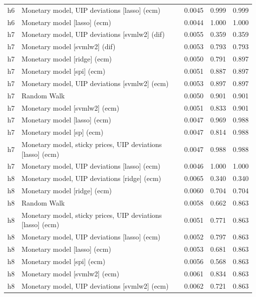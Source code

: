 \begin{ThreePartTable}
\begin{longtable}[t]{cp{5.5cm}ccc}
h6 & \raggedright Monetary model, UIP deviations [lasso] (ecm) & 0.0045 & 0.999 & 0.999\\
h6 & \raggedright Monetary model [lasso] (ecm) & 0.0044 & 1.000 & 1.000\\
\addlinespace
h7 & \raggedright Monetary model, UIP deviations [svmlw2] (dif) & 0.0055 & 0.359 & 0.359\\
h7 & \raggedright Monetary model [svmlw2] (dif) & 0.0053 & 0.793 & 0.793\\
h7 & \raggedright Monetary model [ridge] (ecm) & 0.0050 & 0.791 & 0.897\\
h7 & \raggedright Monetary model [spi] (ecm) & 0.0051 & 0.887 & 0.897\\
h7 & \raggedright Monetary model, UIP deviations [svmlw2] (ecm) & 0.0053 & 0.897 & 0.897\\
h7 & \raggedright Random Walk & 0.0050 & 0.901 & 0.901\\
h7 & \raggedright Monetary model [svmlw2] (ecm) & 0.0051 & 0.833 & 0.901\\
h7 & \raggedright Monetary model [lasso] (ecm) & 0.0047 & 0.969 & 0.988\\
h7 & \raggedright Monetary model [sp] (ecm) & 0.0047 & 0.814 & 0.988\\
h7 & \raggedright Monetary model, sticky prices, UIP deviations [lasso] (ecm) & 0.0047 & 0.988 & 0.988\\
h7 & \raggedright Monetary model, UIP deviations [lasso] (ecm) & 0.0046 & 1.000 & 1.000\\
\addlinespace
h8 & \raggedright Monetary model, UIP deviations [ridge] (ecm) & 0.0065 & 0.340 & 0.340\\
h8 & \raggedright Monetary model [ridge] (ecm) & 0.0060 & 0.704 & 0.704\\
h8 & \raggedright Random Walk & 0.0058 & 0.662 & 0.863\\
h8 & \raggedright Monetary model, sticky prices, UIP deviations [lasso] (ecm) & 0.0051 & 0.771 & 0.863\\
h8 & \raggedright Monetary model, UIP deviations [lasso] (ecm) & 0.0052 & 0.797 & 0.863\\
h8 & \raggedright Monetary model [lasso] (ecm) & 0.0053 & 0.681 & 0.863\\
h8 & \raggedright Monetary model [spi] (ecm) & 0.0056 & 0.568 & 0.863\\
h8 & \raggedright Monetary model [svmlw2] (ecm) & 0.0061 & 0.834 & 0.863\\
h8 & \raggedright Monetary model, UIP deviations [svmlw2] (ecm) & 0.0062 & 0.721 & 0.863\\

\end{longtable}
\end{ThreePartTable}
